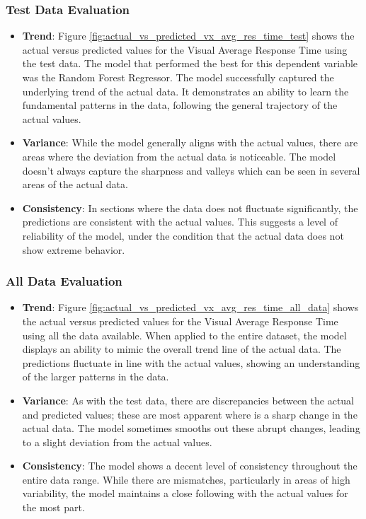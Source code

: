 \subsubsection*{Test Data Evaluation}

\begin{itemize}
    \item \textbf{Trend}: Figure \ref{fig:actual_vs_predicted_vx_avg_res_time_test} shows the actual versus predicted values for the Visual Average Response Time using the test data.
        The model that performed the best for this dependent variable was the Random Forest Regressor. The model successfully captured the underlying trend of the actual data. 
        It demonstrates an ability to learn the fundamental patterns in the data, following the general trajectory of the actual values.
    \item \textbf{Variance}: While the model generally aligns with the actual values, there are areas where the deviation from the actual data is noticeable. The model doesn't
          always capture the sharpness and valleys which can be seen in several areas of the actual data.
    \item \textbf{Consistency}: In sections where the data does not fluctuate significantly, the predictions are consistent with the actual values. This suggests a level
          of reliability of the model, under the condition that the actual data does not show extreme behavior. 
\end{itemize}

\subsubsection*{All Data Evaluation}

\begin{itemize}
    \item \textbf{Trend}: Figure \ref{fig:actual_vs_predicted_vx_avg_res_time_all_data} shows the actual versus predicted values for the Visual Average Response Time using all the data available.
          When applied to the entire dataset, the model displays an ability to mimic the overall trend line of the actual data. The predictions fluctuate in line with the actual values,
          showing an understanding of the larger patterns in the data.
    \item \textbf{Variance}: As with the test data, there are discrepancies between the actual and predicted values; these are most apparent where is a sharp change in the actual data.
          The model sometimes smooths out these abrupt changes, leading to a slight deviation from the actual values.
    \item \textbf{Consistency}: The model shows a decent level of consistency throughout the entire data range. While there are mismatches, particularly in areas of high variability,
          the model maintains a close following with the actual values for the most part.
\end{itemize}

